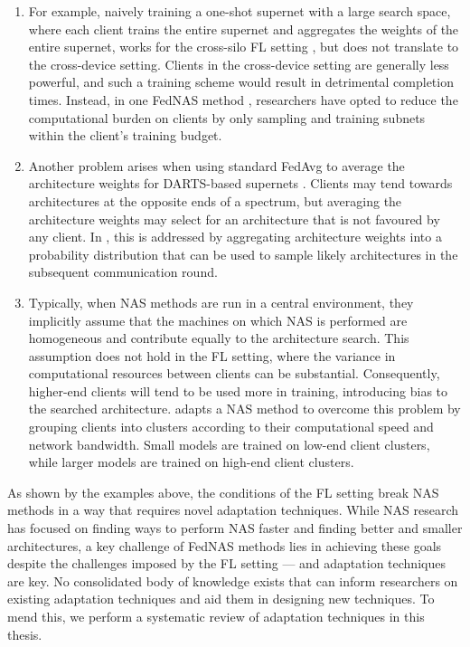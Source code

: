 \begin{enumerate}
    \item For example, naively training a one-shot supernet with a large search space, where each client trains the entire supernet and aggregates the weights of the entire supernet, works for the cross-silo FL setting \cite{fednas_2021}, but does not translate to the cross-device setting. Clients in the cross-device setting are generally less powerful, and such a training scheme would result in detrimental completion times. Instead, in one FedNAS method \cite{fedoras_2022}, researchers have opted to reduce the computational burden on clients by only sampling and training subnets within the client's training budget.
    \item Another problem arises when using standard FedAvg to average the architecture weights for DARTS-based supernets \cite{darts_2019}. Clients may tend towards architectures at the opposite ends of a spectrum, but averaging the architecture weights may select for an architecture that is not favoured by any client. In \cite{efnas_2024}, this is addressed by aggregating architecture weights into a probability distribution that can be used to sample likely architectures in the subsequent communication round.
    \item Typically, when NAS methods are run in a central environment, they implicitly assume that the machines on which NAS is performed are homogeneous and contribute equally to the architecture search. This assumption does not hold in the FL setting, where the variance in computational resources between clients can be substantial. Consequently, higher-end clients will tend to be used more in training, introducing bias to the searched architecture. \cite{network_aware_fed_nas_2025} adapts a NAS method to overcome this problem by grouping clients into clusters according to their computational speed and network bandwidth. Small models are trained on low-end client clusters, while larger models are trained on high-end client clusters.
\end{enumerate}

As shown by the examples above, the conditions of the FL setting break NAS methods in a way that requires novel adaptation techniques. While NAS research has focused on finding ways to perform NAS faster and finding better and smaller architectures, a key challenge of FedNAS methods lies in achieving these goals despite the challenges imposed by the FL setting — and adaptation techniques are key. No consolidated body of knowledge exists that can inform researchers on existing adaptation techniques and aid them in designing new techniques. To mend this, we perform a systematic review of adaptation techniques in this thesis. 

